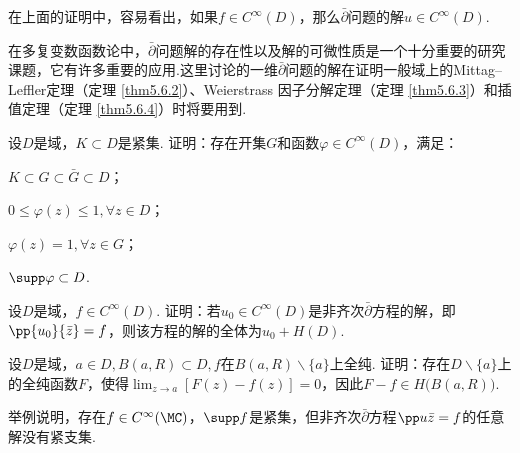 在上面的证明中，容易看出，如果$f\in C^\infty(D)$，那么$\bar\partial$问题的解$u\in C^\infty(D)$.

在多复变数函数论中，$\bar\partial$问题解的存在性以及解的可微性质是一个十分重要的研究课题，它有许多重要的应用.这里讨论的一维$\bar\partial$问题的解在证明一般域上的Mittag--Leffler定理（定理 \ref{thm5.6.2}）、Weierstrass 因子分解定理（定理 \ref{thm5.6.3}）和插值定理（定理
 \ref{thm5.6.4}）时将要用到.
\begin{xiti}
\item 设$D$是域，$K\subset D$是紧集. 证明：存在开集$G$和函数$\varphi\in C^\infty(D)$，满足：
\begin{enuma}
  \item $K\subset G\subset \bar G\subset D$；
  \item $0\le\varphi(z)\le1,\forall z\in D$；
  \item $\varphi(z)=1,\forall z\in G$；
  \item $\supp\varphi\subset D$.
\end{enuma}
\item 设$D$是域，$f\in C^\infty(D)$. 证明：若$u_0\in C^\infty(D)$是非齐次$\bar\partial$方程的解，即$\pp{u_0}{\bar z}=f$，则该方程的解的全体为$u_0+H(D)$.
\item 设$D$是域，$a\in D,B(a,R)\subset D,f$在$B(a,R)\backslash\{a\}$上全纯. 证明：存在$D\backslash\{a\}$上的全纯函数$F$，使得$\lim_{z\to a}[F(z)-f(z)]=0$，因此$F-f\in H\big(B(a,R)\big)$.
\item 举例说明，存在$f\in C^\infty(\MC)$，$\supp f$是紧集，但非齐次$\bar\partial$方程$\pp u{\bar z}=f$的任意解没有紧支集.
\end{xiti}
